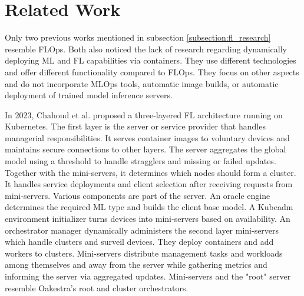\section{Related Work}

Only two previous works \cite{paper:fl_toward_on_demand_client_deployment_at_edge, paper:global_fl_platform_for_iot} mentioned in subsection \ref{subsection:fl_research} resemble FLOps.
Both also noticed the lack of research regarding dynamically deploying ML and FL capabilities via containers.
They use different technologies and offer different functionality compared to FLOps.
They focus on other aspects and do not incorporate MLOps tools, automatic image builds, or automatic deployment of trained model inference servers.

In 2023, Chahoud et al. \cite{paper:fl_toward_on_demand_client_deployment_at_edge} proposed a three-layered FL architecture running on Kubernetes.
The first layer is the server or service provider that handles managerial responsibilities.
It serves container images to voluntary devices and maintains secure connections to other layers.
The server aggregates the global model using a threshold to handle stragglers and missing or failed updates.
Together with the mini-servers, it determines which nodes should form a cluster.
It handles service deployments and client selection after receiving requests from mini-servers.
Various components are part of the server.
An oracle engine determines the required ML type and builds the client base model.
A Kubeadm environment initializer turns devices into mini-servers based on availability.
An orchestrator manager dynamically administers the second layer mini-servers which handle clusters and surveil devices.
They deploy containers and add workers to clusters.
Mini-servers distribute management tasks and workloads among themselves and away from the server while gathering metrics and informing the server via aggregated updates.
Mini-servers and the "root" server resemble Oakestra's root and cluster orchestrators.


